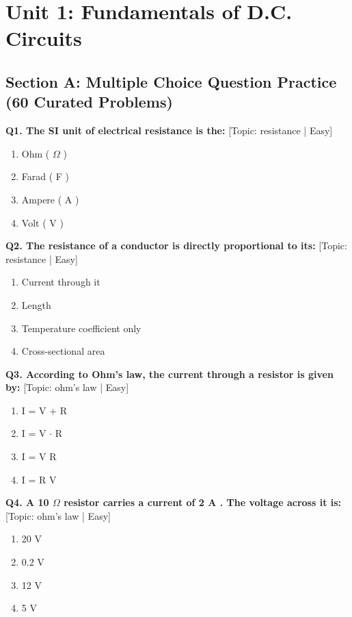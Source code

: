 \chapter{Unit 1: Fundamentals of D.C. Circuits}

\section{Section A: Multiple Choice Question Practice (60 Curated Problems)}

\noindent\textbf{Q1. The SI unit of electrical resistance is the:} \hfill [Topic: resistance | Easy]
\begin{enumerate}[label=(\alph*),topsep=2pt,itemsep=1pt,partopsep=0pt,parsep=0pt]
    \item {Ohm ( $\Omega$ )}
    \item {Farad ( F )}
    \item {Ampere ( A )}
    \item {Volt ( V )}
\end{enumerate}
\vspace{2mm}

\noindent\textbf{Q2. The resistance of a conductor is directly proportional to its:} \hfill [Topic: resistance | Easy]
\begin{enumerate}[label=(\alph*),topsep=2pt,itemsep=1pt,partopsep=0pt,parsep=0pt]
    \item {Current through it}
    \item {Length}
    \item {Temperature coefficient only}
    \item {Cross-sectional area}
\end{enumerate}
\vspace{2mm}

\noindent\textbf{Q3. According to Ohm's law, the current through a resistor is given by:} \hfill [Topic: ohm's law | Easy]
\begin{enumerate}[label=(\alph*),topsep=2pt,itemsep=1pt,partopsep=0pt,parsep=0pt]
    \item {I = V + R}
    \item {I = V $\cdot$ R}
    \item {I = V R}
    \item {I = R V}
\end{enumerate}
\vspace{2mm}

\noindent\textbf{Q4. A 10 $\Omega$ resistor carries a current of 2 A . The voltage across it is:} \hfill [Topic: ohm's law | Easy]
\begin{enumerate}[label=(\alph*),topsep=2pt,itemsep=1pt,partopsep=0pt,parsep=0pt]
    \item {20 V}
    \item {0.2 V}
    \item {12 V}
    \item {5 V}
\end{enumerate}
\vspace{2mm}

